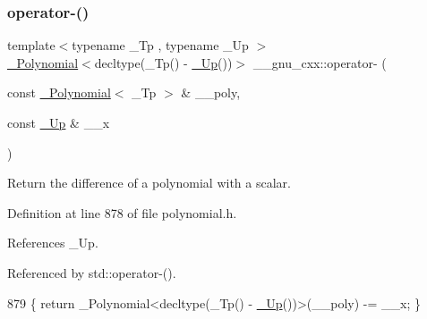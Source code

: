 \subsubsection{\texorpdfstring{operator-\/()}{operator-()}\hspace{0.1cm}{\footnotesize\ttfamily [4/6]}}
{\footnotesize\ttfamily template$<$typename \+\_\+\+Tp , typename \+\_\+\+Up $>$ \\
\hyperlink{class____gnu__cxx_1_1__Polynomial}{\+\_\+\+Polynomial}$<$decltype(\+\_\+\+Tp() -\/ \hyperlink{namespace____gnu__cxx_ab693ea357b6429b331e0bf09f9442385}{\+\_\+\+Up}())$>$ \+\_\+\+\_\+gnu\+\_\+cxx\+::operator-\/ (\begin{DoxyParamCaption}\item[{const \hyperlink{class____gnu__cxx_1_1__Polynomial}{\+\_\+\+Polynomial}$<$ \+\_\+\+Tp $>$ \&}]{\+\_\+\+\_\+poly,  }\item[{const \hyperlink{namespace____gnu__cxx_ab693ea357b6429b331e0bf09f9442385}{\+\_\+\+Up} \&}]{\+\_\+\+\_\+x }\end{DoxyParamCaption})\hspace{0.3cm}{\ttfamily [inline]}}

Return the difference of a polynomial with a scalar. 

Definition at line 878 of file polynomial.\+h.



References \+\_\+\+Up.



Referenced by std\+::operator-\/().


\begin{DoxyCode}
879     \{ \textcolor{keywordflow}{return} \_Polynomial<decltype(\_Tp() - \hyperlink{namespace____gnu__cxx_ab693ea357b6429b331e0bf09f9442385}{\_Up}())>(\_\_poly) -= \_\_x; \}
\end{DoxyCode}
\mbox{\label{namespace____gnu__cxx_acc72fd3c1efcf09698d30d42c4a1eb1b}} 

